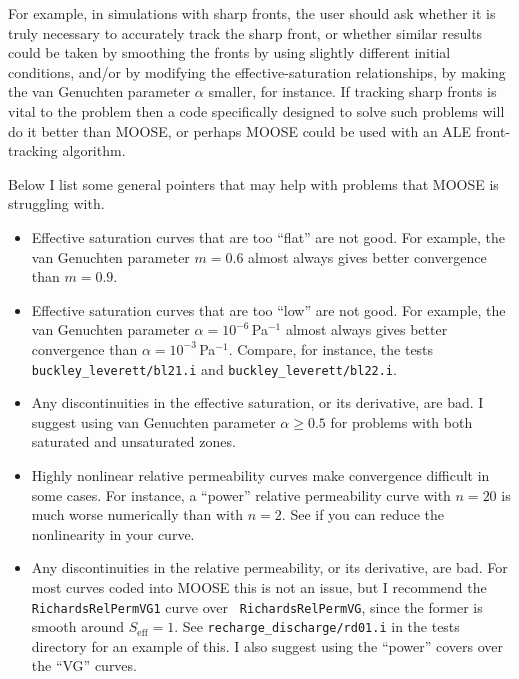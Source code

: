 \documentclass[]{scrreprt}
\begin{document}
For example, in simulations with sharp fronts, the user should ask
whether it is truly necessary to accurately track the sharp front, or
whether similar results could be taken by smoothing the fronts by
using slightly different initial conditions, and/or by modifying the
effective-saturation relationships, by making the van Genuchten
parameter $\alpha$ smaller, for instance.  If tracking sharp fronts is
vital to the problem then a code specifically designed to solve such
problems will do it better than MOOSE, or perhaps MOOSE could be used
with an ALE front-tracking algorithm.

Below I list some general pointers that may help with problems that
MOOSE is struggling with.
\begin{itemize}
\item Effective saturation curves that are too ``flat'' are not good.
  For example, the van Genuchten parameter $m=0.6$ almost always gives
  better convergence than $m=0.9$.
\item Effective saturation curves that are too ``low'' are not good.
  For example, the van Genuchten parameter $\alpha=10^{-6}$\,Pa$^{-1}$
  almost always gives better convergence than
  $\alpha=10^{-3}$\,Pa$^{-1}$.  Compare, for instance, the tests {\tt
    buckley\_leverett/bl21.i} and {\tt buckley\_leverett/bl22.i}.
\item Any discontinuities in the effective saturation, or its
  derivative, are bad.  I suggest using van Genuchten parameter
  $\alpha\geq 0.5$ for problems with both saturated and unsaturated zones.
\item Highly nonlinear relative permeability curves make convergence
  difficult in some cases.  For instance, a ``power'' relative
  permeability curve with $n=20$ is much worse numerically than with
  $n=2$.  See if you can reduce the nonlinearity in your curve.
\item Any discontinuities in the relative permeability, or its derivative,
  are bad.  For most curves coded into MOOSE this is not an issue, but
  I recommend the {\tt RichardsRelPermVG1} curve over {\tt
    RichardsRelPermVG}, since the former is smooth around
  $S_{\mathrm{eff}}=1$.  See {\tt recharge\_discharge/rd01.i} in the
  tests directory for an example of this.   I also suggest using the
  ``power'' covers over the ``VG'' curves.
\end{itemize}
\end{document}
